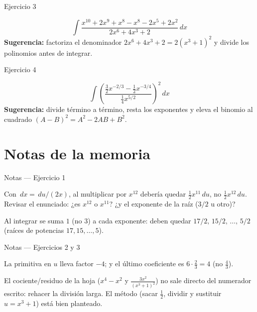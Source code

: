 \documentclass[aspectratio=169]{beamer}
\newcommand{\dx}{\,dx}
\newcommand{\du}{\,du}
\begin{document}
\begin{frame}{Ejercicio 3}
  \begin{mwejercicio}
    \[
      \int \frac{x^{10}+2x^{9}+x^{8}-x^{8}-2x^{5}+2x^{2}}{2x^{6}+4x^{3}+2}\dx
    \]
    \small
    \textbf{Sugerencia:} factoriza el denominador $2x^{6}+4x^{3}+2 = 2(x^{3}+1)^{2}$
    y divide los polinomios antes de integrar.
  \end{mwejercicio}
\end{frame}

\begin{frame}{Ejercicio 4}
  \begin{mwejercicio}
    \[
      \int \left(\frac{\tfrac{3}{2}x^{-2/3}-\tfrac{1}{2}x^{-3/4}}{\tfrac{1}{4}x^{5/2}}\right)^{2}\dx
    \]
    \small
    \textbf{Sugerencia:} divide término a término, resta los exponentes y eleva
    el binomio al cuadrado $(A-B)^{2}=A^{2}-2AB+B^{2}$.
  \end{mwejercicio}
\end{frame}

\section{Notas de la memoria}

\begin{frame}{Notas — Ejercicio 1}
  \begin{mwextra}[Obs.~1.1 — el factor $x$ del $\dx$]
    Con $\dx = \du/(2x)$, al multiplicar por $x^{12}$ debería quedar
    $\tfrac12 x^{11}\du$, no $\tfrac12 x^{12}\du$. Revisar el enunciado:
    ¿es $x^{12}$ o $x^{11}$? ¿y el exponente de la raíz ($3/2$ u otro)?
  \end{mwextra}
  \vspace{3pt}
  \begin{mwextra}
    Al integrar se suma $1$ (no $3$) a cada exponente: deben quedar
    $17/2,\,15/2,\,\dots,\,5/2$ (raíces de potencias $17,15,\dots,5$).
  \end{mwextra}
\end{frame}

\begin{frame}{Notas — Ejercicios 2 y 3}
  \begin{mwextra}
    La primitiva en $u$ lleva factor $-4$; y el último coeficiente es
    $6\cdot\tfrac23 = 4$ (no $\tfrac43$).
  \end{mwextra}
  \vspace{3pt}
  \begin{mwextra}
    El cociente/residuo de la hoja ($x^{4}-x^{2}$ y $\tfrac{3x^{2}}{(x^{3}+1)^{2}}$)
    no sale directo del numerador escrito: rehacer la división larga. El método
    (sacar $\tfrac12$, dividir y sustituir $u=x^{3}+1$) está bien planteado.
  \end{mwextra}
\end{frame}
\end{document}
